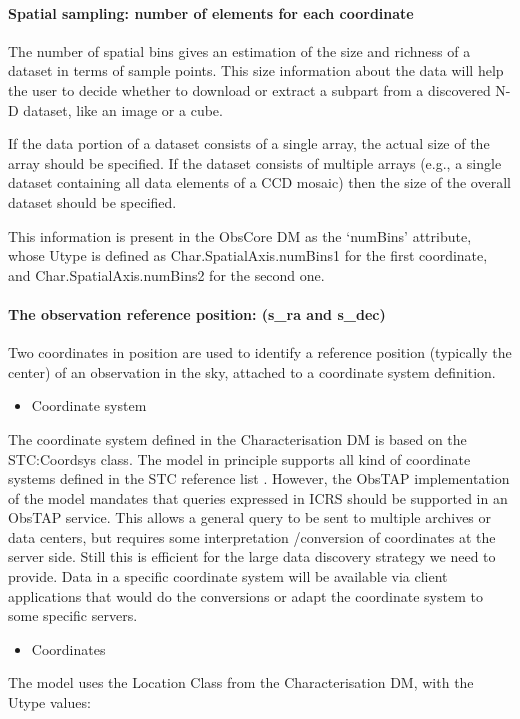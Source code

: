 \documentclass[11pt,a4paper]{ivoa}
\begin{document}
\paragraph[Spatial sampling: number of elements for each coordinate ]{Spatial sampling: number of elements for each
coordinate}
The number of spatial bins gives an estimation of the size and richness of a dataset in terms of sample points. This
size information about the data will help the user to decide whether to download or extract a subpart from a discovered
N-D dataset, like an image or a cube.

If the data portion of a dataset consists of a single array, the actual size of the array should be specified.  If the
dataset consists of multiple arrays (e.g., a single dataset containing all data elements of a CCD mosaic) then the size
of the overall dataset should be specified.

This information is present in the ObsCore DM as the `numBins' attribute, whose Utype is defined as
Char.SpatialAxis.numBins1 for the first coordinate, and Char.SpatialAxis.numBins2 for the second one.

\paragraph{The observation reference position: (s\_ra and s\_dec)}
Two coordinates in position are used to identify a reference position (typically the center) of an observation in the
sky, attached to a coordinate system definition. 

\begin{itemize}
\item Coordinate system
\end{itemize}
The coordinate system defined in the Characterisation DM is based on the STC:Coordsys class.  The model in principle
supports all kind of coordinate systems defined in the STC reference list \citep{2009ivoa.rept.1030R}. However, the ObsTAP
implementation of the model mandates that queries expressed in ICRS should be supported in an ObsTAP service. This
allows a general query to be sent to multiple archives or data centers, but requires some interpretation /conversion of
coordinates at the server side. Still this is efficient for the large data discovery strategy we need to provide.  Data
in a specific coordinate system will be available via client applications that would do the conversions or adapt the
coordinate system to some specific servers.

\begin{itemize}
\item Coordinates
\end{itemize}
The model uses the Location Class from the Characterisation DM, with the Utype values:
\end{document}
